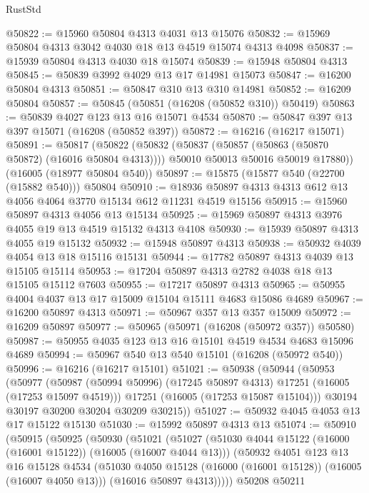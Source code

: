 \begin{lexlean}{RustStd}
\begin{coremodule}
@50822 := @15960 @50804 @4313 @4031 @13 @15076
@50832 := @15969 @50804 @4313 @3042 @4030 @18 @13 @4519 @15074 @4313 @4098
@50837 := @15939 @50804 @4313 @4030 @18 @15074
@50839 := @15948 @50804 @4313
@50845 := @50839 @3992 @4029 @13 @17 @14981 @15073
@50847 := @16200 @50804 @4313
@50851 := @50847 @310 @13 @310 @14981
@50852 := @16209 @50804
@50857 := @50845 (@50851 (@16208 (@50852 @310)) @50419)
@50863 := @50839 @4027 @123 @13 @16 @15071 @4534
@50870 := @50847 @397 @13 @397 @15071 (@16208 (@50852 @397))
@50872 := @16216 (@16217 @15071)
@50891 := @50817
    (@50822
      (@50832
        (@50837 (@50857 (@50863 (@50870 @50872) (@16016 @50804 @4313))))
        @50010
        @50013
        @50016
        @50019
        @17880))
    (@16005 (@18977 @50804 @540))
@50897 := @15875 (@15877 @540 (@22700 (@15882 @540))) @50804
@50910 := @18936 @50897 @4313 @4313 @612 @13 @4056 @4064 @3770 @15134 @612 @11231 @4519 @15156
@50915 := @15960 @50897 @4313 @4056 @13 @15134
@50925 := @15969 @50897 @4313 @3976 @4055 @19 @13 @4519 @15132 @4313 @4108
@50930 := @15939 @50897 @4313 @4055 @19 @15132
@50932 := @15948 @50897 @4313
@50938 := @50932 @4039 @4054 @13 @18 @15116 @15131
@50944 := @17782 @50897 @4313 @4039 @13 @15105 @15114
@50953 := @17204 @50897 @4313 @2782 @4038 @18 @13 @15105 @15112 @7603
@50955 := @17217 @50897 @4313
@50965 := @50955 @4004 @4037 @13 @17 @15009 @15104 @15111 @4683 @15086 @4689
@50967 := @16200 @50897 @4313
@50971 := @50967 @357 @13 @357 @15009
@50972 := @16209 @50897
@50977 := @50965 (@50971 (@16208 (@50972 @357)) @50580)
@50987 := @50955 @4035 @123 @13 @16 @15101 @4519 @4534 @4683 @15096 @4689
@50994 := @50967 @540 @13 @540 @15101 (@16208 (@50972 @540))
@50996 := @16216 (@16217 @15101)
@51021 := @50938
    (@50944
      (@50953
        (@50977
          (@50987 (@50994 @50996) (@17245 @50897 @4313) @17251 (@16005 (@17253 @15097 @4519)))
          @17251
          (@16005 (@17253 @15087 @15104)))
        @30194
        @30197
        @30200
        @30204
        @30209
        @30215))
@51027 := @50932 @4045 @4053 @13 @17 @15122 @15130
@51030 := @15992 @50897 @4313 @13
@51074 := @50910
    (@50915
      (@50925
        (@50930
          (@51021
            (@51027
              (@51030 @4044 @15122 (@16000 (@16001 @15122)) (@16005 (@16007 @4044 @13)))
              (@50932
                @4051
                @123
                @13
                @16
                @15128
                @4534
                (@51030 @4050 @15128 (@16000 (@16001 @15128)) (@16005 (@16007 @4050 @13)))
                (@16016 @50897 @4313)))))
        @50208
        @50211

\end{coremodule}
\end{lexlean}
